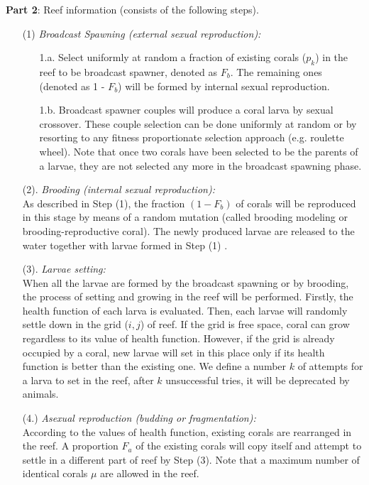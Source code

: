 \documentclass[review,3p,authoryear]{elsarticle}
\begin{document}
\textbf{Part 2}: Reef information (consists of the following steps).
\begin{enumerate}
\item[(1)]\textit{Broadcast Spawning (external sexual reproduction):}
\begin{enumerate}

\item[1.a.] Select uniformly at random a fraction of existing corals ($p_{k}$) in the reef to be broadcast spawner, denoted as $F_{b}$. The remaining ones (denoted as 1 - $F_{b}$) will be formed by internal sexual reproduction.

\item[1.b.] Broadcast spawner couples will produce a coral larva by sexual crossover. These couple selection can be done uniformly at random or by resorting to any fitness proportionate selection approach (e.g. roulette wheel). Note that once two corals have been selected to be the parents of a larvae, they are not selected any more in the broadcast spawning phase.
\end{enumerate}

\item[(2).] \textit{Brooding (internal sexual reproduction):} \\
As described in Step (1), the fraction $(1 - F_{b})$ of corals will be reproduced in this stage by means of a random mutation (called brooding modeling or brooding-reproductive coral). The newly produced larvae are released to the water together with larvae formed in Step (1) .

\item[(3).] \textit{Larvae setting:} \\
When all the larvae are formed by the broadcast spawning or by brooding, the process of setting and growing in the reef will be performed. Firstly, the health function of each larva is evaluated. Then, each larvae will randomly settle down in the grid ($i,j$) of reef. If the grid is free space, coral can grow regardless to its value of health function. However, if the grid is already occupied by a coral, new larvae will set in this place only if its health function is better than the existing one. We define a number $k$ of attempts for a larva to set in the reef, after $k$ unsuccessful tries, it will be deprecated by animals.

\item[(4.)] \textit{Asexual reproduction (budding or fragmentation):} \\
According to the values of health function, existing corals are rearranged in the reef. A proportion $F_a$ of the existing corals will copy itself and attempt to settle in a different part of reef by Step (3). Note that a maximum number of identical corals $\mu$ are allowed in the reef.


\end{enumerate}
\end{document}

